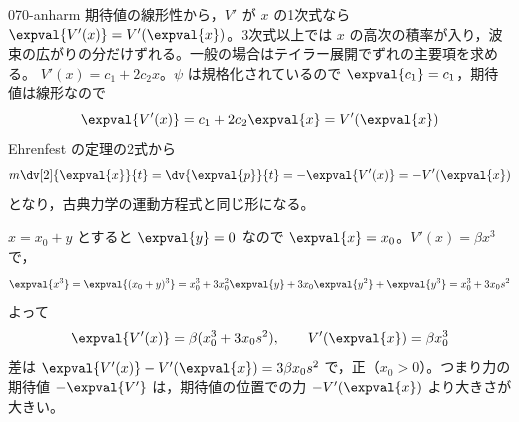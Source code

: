 \documentclass[uplatex,dvipdfmx,a4paper,11pt]{jsarticle}
\begin{document}
\kaitouhen
{}
\begin{kaisetsu}{070-anharm}
\houshin 期待値の線形性から，$V'$ が $x$ の1次式なら $\expval{V'(x)}=V'(\expval{x})$。3次式以上では $x$ の高次の積率が入り，波束の広がりの分だけずれる。一般の場合はテイラー展開でずれの主要項を求める。
\keisan {} $V'(x)=c_{1}+2c_{2}x$。$\psi$ は規格化されているので $\expval{c_{1}}=c_{1}$，期待値は線形なので
\[ \expval{V'(x)}=c_{1}+2c_{2}\expval{x}=V'(\expval{x}) \]
Ehrenfest の定理の2式から
\[ m\dv[2]{\expval{x}}{t}=\dv{\expval{p}}{t}=-\expval{V'(x)}=-V'(\expval{x}) \]
となり，古典力学の運動方程式と同じ形になる。

 $x=x_{0}+y$ とすると $\expval{y}=0$ なので $\expval{x}=x_{0}$。$V'(x)=\beta x^{3}$ で，
\[ \expval{x^{3}}=\expval{(x_{0}+y)^{3}}=x_{0}^{3}+3x_{0}^{2}\expval{y}+3x_{0}\expval{y^{2}}+\expval{y^{3}}=x_{0}^{3}+3x_{0}s^{2} \]
よって
\[ \expval{V'(x)}=\beta(x_{0}^{3}+3x_{0}s^{2}),\qquad V'(\expval{x})=\beta x_{0}^{3} \]
差は $\expval{V'(x)}-V'(\expval{x})=3\beta x_{0}s^{2}$ で，正（$x_{0}>0$）。つまり力の期待値 $-\expval{V'}$ は，期待値の位置での力 $-V'(\expval{x})$ より大きさが大きい。


\end{kaisetsu}
\end{document}

